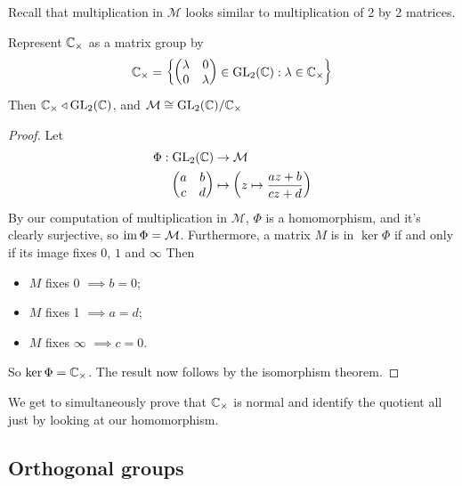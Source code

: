 \documentclass{../template/note}
\begin{document}
    Recall that multiplication in \(\mathcal M\) looks similar to multiplication of 2 by 2 matrices.
    
    \begin{proposition}
        Represent \(\mathbb C_\times\) as a matrix group by 
        \[
            \mathbb C_\times = \left\{\begin{pmatrix}
             \lambda & 0 \\
             0 & \lambda \\
            \end{pmatrix} \in \operatorname{GL}_2(\mathbb C): \lambda \in \mathbb C_\times\right\}
        \]
        Then \(\mathbb C_\times \triangleleft \operatorname{GL}_2(\mathbb C)\), and \(\mathcal M \cong \operatorname{GL}_2(\mathbb C)/\mathbb C_\times\)
    \end{proposition}
    
    \begin{proof}
        Let
        \begin{align*}
            \Phi: \operatorname{GL}_2(\mathbb C) &\to \mathcal M \\
            \begin{pmatrix}
             a & b \\
             c & d \\
            \end{pmatrix} &\mapsto \left(z \mapsto \frac{az+b}{cz+d}\right)
        \end{align*}
        By our computation of multiplication in \(\mathcal M\), \(\Phi\) is a homomorphism, and it's clearly surjective, so \(\operatorname{im} \Phi = \mathcal M\). Furthermore, a matrix \(M\) is in \(\ker \Phi\) if and only if its image fixes \(0\), \(1\) and \(\infty\) Then
        \begin{itemize}
            \item \(M\) fixes 0 \(\implies b = 0\);
            \item \(M\) fixes 1 \(\implies a = d\);
            \item \(M\) fixes \(\infty\) \(\implies c = 0\).
        \end{itemize}
        So \(\ker \Phi = \mathbb C_\times\). The result now follows by the isomorphism theorem.
    \end{proof}
    
    \begin{remark*}
        We get to simultaneously prove that \(\mathbb C_\times\) is normal and identify the quotient all just by looking at our homomorphism.
    \end{remark*}
    
    \subsection{Orthogonal groups}
\end{document}
